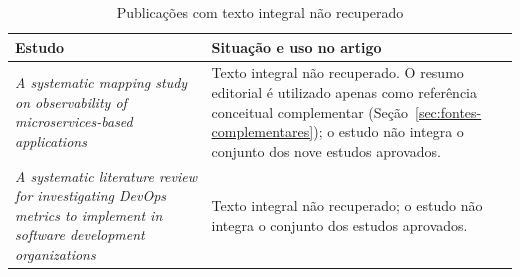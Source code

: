 \begin{table}[H]
\centering
\caption{Publicações com texto integral não recuperado}\label{tab:nao-recuperados}
\footnotesize
\begin{tabularx}{\linewidth}{@{}>{\raggedright\arraybackslash}p{4.2cm}X@{}}
\toprule
\textbf{Estudo} & \textbf{Situação e uso no artigo} \\
\midrule
\cite{gomes2025}\newline \emph{A systematic mapping study on observability of
  microservices-based applications}
  & Texto integral não recuperado. O resumo editorial é utilizado apenas
    como referência conceitual complementar
    (Seção~\ref{sec:fontes-complementares}); o estudo não integra o conjunto
    dos nove estudos aprovados. \\
\addlinespace
\cite{kumar2025}\newline \emph{A systematic literature review for
  investigating DevOps metrics to implement in software development
  organizations}
  & Texto integral não recuperado; o estudo não integra o conjunto dos
    estudos aprovados. \\
\bottomrule
\end{tabularx}
\end{table}

\FloatBarrier
